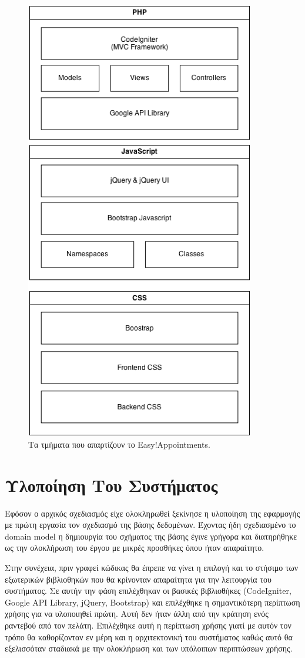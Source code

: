 \begin{figure}[ht!]
\centering
\includegraphics[width=100mm]{images/system-architecture.png}
\caption{Τα τμήματα που απαρτίζουν το Easy!Appointments.}
\label{system-architecture}
\end{figure}

\section{Υλοποίηση Του Συστήματος}
Εφόσον ο αρχικός σχεδιασμός είχε ολοκληρωθεί ξεκίνησε η υλοποίηση της εφαρμογής με πρώτη εργασία τον σχεδιασμό της βάσης δεδομένων. Έχοντας ήδη σχεδιασμένο το domain model η δημιουργία του σχήματος της βάσης έγινε γρήγορα και διατηρήθηκε ως την ολοκλήρωση του έργου με μικρές προσθήκες όπου ήταν απαραίτητο. 

Στην συνέχεια, πριν γραφεί κώδικας θα έπρεπε να γίνει η επιλογή και το στήσιμο των εξωτερικών βιβλιοθηκών που θα κρίνονταν απαραίτητα για την λειτουργία του συστήματος. Σε αυτήν την φάση επιλέχθηκαν οι βασικές βιβλιοθήκες (CodeIgniter, Google API Library, jQuery, Bootstrap) και επιλέχθηκε η σημαντικότερη περίπτωση χρήσης για να υλοποιηθεί πρώτη. Αυτή δεν ήταν άλλη από την κράτηση ενός ραντεβού από τον πελάτη. Επιλέχθηκε αυτή η περίπτωση χρήσης γιατί με αυτόν τον τρόπο θα καθορίζονταν εν μέρη και η αρχιτεκτονική του συστήματος καθώς αυτό θα εξελισσόταν σταδιακά με την ολοκλήρωση και των υπόλοιπων περιπτώσεων χρήσης.

